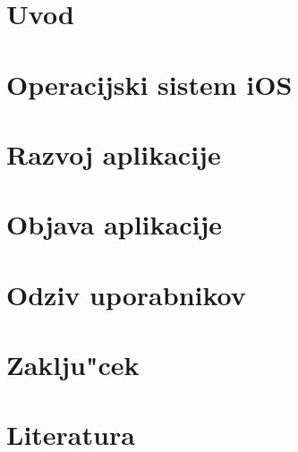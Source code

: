 \documentclass[a4paper, 12pt]{article}
\begin{document}
	\pagebreak

	\tableofcontents
	\pagebreak

	\section{Uvod}
	

	\section{Operacijski sistem iOS}
	

	\section{Razvoj aplikacije}
	

	\section{Objava aplikacije}
	

	\section{Odziv uporabnikov}
	

	\section{Zaklju"cek}
	

	\newpage
	\section{Literatura}
	\printbibliography[heading=none]
\end{document}
